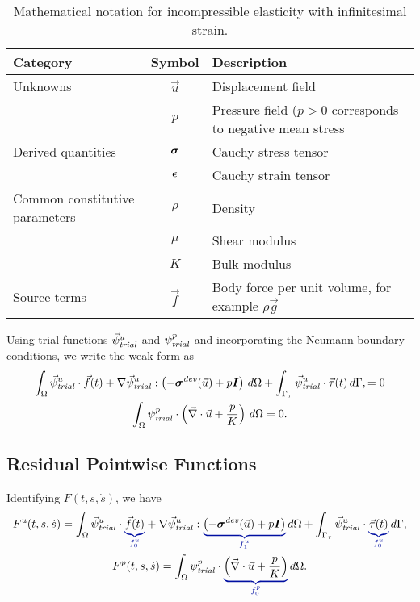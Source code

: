 \begin{table}[htbp]
  \caption{Mathematical notation for incompressible elasticity with
    infinitesimal strain.}
  \label{tab:notation:incompressible:elasticity}
  \begin{tabular}{lcp{3.5in}}
    \toprule
    {\bf Category} & {\bf Symbol} & {\bf Description} \\
    \midrule
    Unknowns & $\vec{u}$ & Displacement field \\
    & $p$ & Pressure field ($p>0$ corresponds to negative mean stress \\
    Derived quantities & $\tensor{\sigma}$ & Cauchy stress tensor \\
                   & $\tensor{\epsilon}$ & Cauchy strain tensor \\
    Common constitutive parameters & $\rho$ & Density \\
  & $\mu$ & Shear modulus \\
  & $K$ & Bulk modulus \\
Source terms & $\vec{f}$ & Body force per unit volume, for example $\rho \vec{g}$ \\
    \bottomrule
  \end{tabular}
\end{table}

Using trial functions $\trialvec[u]$ and $\trialscalar[p]$ and
incorporating the Neumann boundary conditions, we write the weak form
as
\begin{gather}
  \int_\Omega \trialvec[u] \cdot \vec{f}(t) + \nabla \trialvec[u] : \left(-\tensor{\sigma}^\mathit{dev}(\vec{u}) + p\tensor{I}
  \right)\, d\Omega + \int_{\Gamma_\tau} \trialvec[u] \cdot \vec{\tau}(t) \, d\Gamma, = 0 \\
  \int_\Omega \trialscalar[p] \cdot \left(\vec{\nabla} \cdot \vec{u} + \frac{p}{K} \right) \, d\Omega = 0.
\end{gather}

\subsection{Residual Pointwise Functions}

Identifying $F(t,s,\dot{s})$, we have
\begin{gather}
  \label{eqn:incompressible:elasticity:displacement}
  F^u(t,s,\dot{s}) = \int_\Omega \trialvec[u] \cdot \eqnannotate{\vec{f}(t)}{f_0^u} + \nabla \trialvec[u] :
  \eqnannotate{\left(-\tensor{\sigma}^\mathit{dev}(\vec{u}) + p\tensor{I}\right)}{f_1^u}  \, d\Omega
  + \int_{\Gamma_\tau} \trialvec[u] \cdot \eqnannotate{\vec{\tau}(t)}{f_0^u} \, d\Gamma, \\
%
  \label{eqn:incompressible:elasticity:pressure}
  F^p(t,s,\dot{s}) = \int_\Omega \trialscalar[p] \cdot \eqnannotate{\left(\vec{\nabla} \cdot \vec{u} + 
\frac{p}{K} \right)}{f_0^p} \, d\Omega.
\end{gather}

